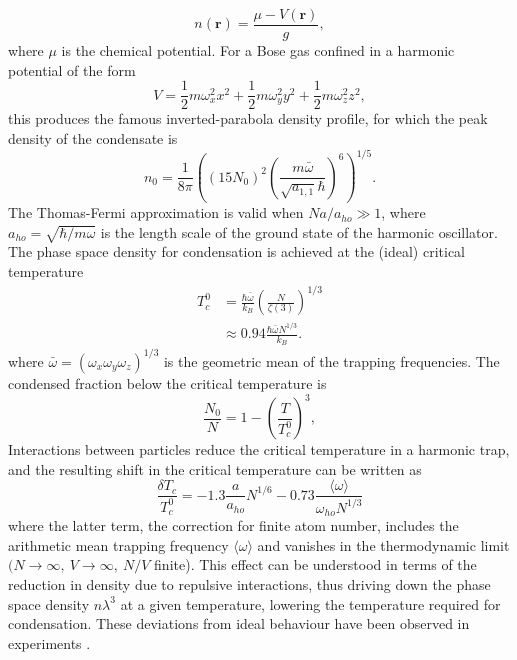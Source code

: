 	\begin{equation}
		n(\textbf{r}) = \frac{\mu-V(\textbf{r})}{g},
	\end{equation}
	where $\mu$ is the chemical potential. 
	For a Bose gas confined in a harmonic potential of the form
	\begin{equation}
		V = \frac{1}{2} m \omega_x^2 x^2 + \frac{1}{2} m \omega_y^2 y^2 + \frac{1}{2} m \omega_z^2 z^2,
	\end{equation}
	this produces the famous inverted-parabola density profile,	for which the peak density of the condensate is
	\begin{equation}
		n_0 = \frac{1}{8 \pi}\left( (15N_0)^2 \left(\frac{m \bar{\omega}}{\sqrt{a_{1,1}} \hbar}\right)	 ^{6}\right)^{1/5}.
		\label{eqn:n0}
	\end{equation}
	The Thomas-Fermi approximation is valid when $N a/a_{ho}\gg1$, where $a_{ho} = \sqrt{\hbar/m\omega}$ is the length scale of the ground state of the harmonic oscillator. The phase space density for condensation is achieved at the (ideal) critical temperature 
	\begin{align}
		T_c^{0} &= \frac{\hbar \bar{\omega}}{k_B}\left(\frac{N}{\zeta(3)}\right)^{1/3}\\
				&\approx0.94\frac{\hbar \bar{\omega} N^{1/3}}{k_B}.
	\end{align}
	where $\bar{\omega}=(\omega_x\omega_y\omega_z)^{1/3}$ is the geometric mean of the trapping frequencies. The condensed fraction below the critical temperature is 
	\begin{equation}
		\frac{N_0}{N} = 1 - \left(\frac{T}{T_c^{0}}\right)^3,
	\end{equation}
	Interactions between particles reduce the critical temperature in a harmonic trap, and the resulting shift in the critical temperature can be written as 
	\begin{equation}
		\frac{\delta T_c}{T_c^{0}} = -1.3 \frac{a}{a_{ho}} N^{1/6} -0.73\frac{ \langle\omega\rangle}{\omega_{ho} N^{1/3}}
	\end{equation}
	where the latter term, the correction for finite atom number, includes the arithmetic mean trapping frequency $\langle\omega\rangle$ and vanishes in the thermodynamic limit $(N\rightarrow\infty,~V\rightarrow\infty,~N/V$ finite). This effect can be understood in terms of the reduction in density due to repulsive interactions, thus driving down the phase space density $n\lambda^3$ at a given temperature, lowering the temperature required for condensation. These deviations from ideal behaviour have been observed in experiments \cite{tammuz11,smith11}.

